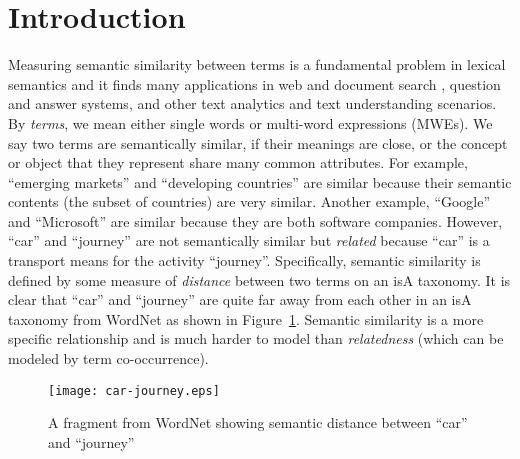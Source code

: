 \section{Introduction}

Measuring semantic similarity between terms is a fundamental problem
in lexical semantics \cite{Budanitsky:2006} and it finds many
applications in web and document search \cite{WangLWZ12:Concept}, question and answer systems,
and other text analytics and text understanding scenarios.  By {\em
  terms}, we mean either single words or multi-word expressions
(MWEs).
We say two terms are semantically similar, if their
meanings are close, or the concept or object that they represent share many common attributes.  For example, ``emerging markets'' and
``developing countries'' are similar because their semantic contents (the subset of countries) are very similar. Another example, ``Google'' and
``Microsoft'' are similar because they are both software companies. %
However, ``car'' and ``journey'' are not semantically similar but {\it related} because ``car'' is a transport means for
  the activity ``journey''. Specifically, semantic
similarity is defined by some measure of {\em distance} between two terms on an isA taxonomy.
It is clear that ``car'' and ``journey'' are quite far away from each other in an isA taxonomy from WordNet as shown in Figure~\ref{fig:tree}.
Semantic similarity is a more specific relationship and is much harder to model than {\em relatedness} (which can be modeled by term
co-occurrence).
\begin{figure}[th]
 \centerline{
 \texttt{[image: car-journey.eps]}}
\caption{A fragment from WordNet showing semantic distance between ``car'' and ``journey''}
\label{fig:tree}
\end{figure}

